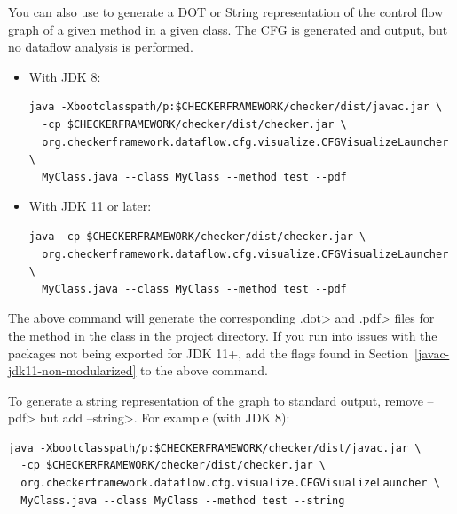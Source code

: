 You can also use  to generate a DOT
or String representation of the control flow graph of a given method in a given class.
The CFG is generated and output, but no dataflow analysis is performed.

\begin{itemize}

\item With JDK 8:

\begin{smaller}
\begin{Verbatim}
java -Xbootclasspath/p:$CHECKERFRAMEWORK/checker/dist/javac.jar \
  -cp $CHECKERFRAMEWORK/checker/dist/checker.jar \
  org.checkerframework.dataflow.cfg.visualize.CFGVisualizeLauncher \
  MyClass.java --class MyClass --method test --pdf
\end{Verbatim}
\end{smaller}


\item With JDK 11 or later:

\begin{smaller}
\begin{Verbatim}
java -cp $CHECKERFRAMEWORK/checker/dist/checker.jar \
  org.checkerframework.dataflow.cfg.visualize.CFGVisualizeLauncher \
  MyClass.java --class MyClass --method test --pdf
\end{Verbatim}
\end{smaller}

\end{itemize}

\noindent
The above command will generate the corresponding \<.dot> and \<.pdf> files for the
method  in the class  in the project directory. If you run into
issues with the  packages not being exported for JDK 11+, add the  flags
found in Section~\ref{javac-jdk11-non-modularized} to the above command.

\noindent To generate a string representation of the graph to standard output,
remove \<--pdf> but add \<--string>. For example (with JDK 8):

\begin{smaller}
\begin{Verbatim}
java -Xbootclasspath/p:$CHECKERFRAMEWORK/checker/dist/javac.jar \
  -cp $CHECKERFRAMEWORK/checker/dist/checker.jar \
  org.checkerframework.dataflow.cfg.visualize.CFGVisualizeLauncher \
  MyClass.java --class MyClass --method test --string
\end{Verbatim}
\end{smaller}

